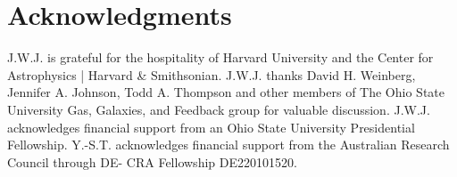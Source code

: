 \documentclass[ms.tex]{subfiles}
\begin{document}
\section{Acknowledgments}
\label{sec:acknowledgments}

J.W.J. is grateful for the hospitality of Harvard University and the 
Center for Astrophysics | Harvard \& Smithsonian.
J.W.J. thanks David H. Weinberg, Jennifer A. Johnson, Todd A. Thompson and
other members of The Ohio State University Gas, Galaxies, and Feedback group
for valuable discussion.
J.W.J. acknowledges financial support from an Ohio State University
Presidential Fellowship.
Y.-S.T. acknowledges financial support from the Australian Research Council
through DE- CRA Fellowship DE220101520.
\end{document}
